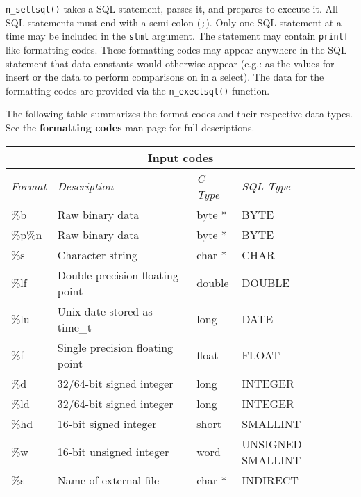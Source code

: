\DESCRIPTION

\verb`n_settsql()` takes a SQL statement, parses it, and prepares to
execute it.  All SQL statements must end with a semi-colon (\verb`;`).
Only one SQL statement at a time may be included in the \verb`stmt`
argument.  The statement may contain \verb`printf` like formatting
codes.  These formatting codes may appear anywhere in the SQL statement
that data constants would otherwise appear (e.g.:  as the values for
insert or the data to perform comparisons on in a select).  The data for
the formatting codes are provided via the \verb`n_exectsql()` function.

The following table summarizes the format codes and their respective
data types.  See the {\bf formatting codes} man page for full
descriptions.

\begin{table}{\label{tab:efmtcodes}}
\begin{tabular}{|l|l|l|l|} \hline
\multicolumn{4}{|c|}{Input codes} \\ \hline
{\em Format}  & {\em Description}               & {\em C Type}  & {\em SQL Type}    \\ \hline
\%b           & Raw binary data                 & byte *        & BYTE              \\
\%p\%n        & Raw binary data                 & byte *        & BYTE              \\
\%s           & Character string                & char *        & CHAR              \\
\%lf          & Double precision floating point & double        & DOUBLE            \\
\%lu          & Unix date stored as time\_t     & long          & DATE              \\
\%f           & Single precision floating point & float         & FLOAT             \\
\%d           & 32/64-bit signed integer        & long          & INTEGER           \\
\%ld          & 32/64-bit signed integer        & long          & INTEGER           \\
\%hd          & 16-bit signed integer           & short         & SMALLINT          \\
\%w           & 16-bit unsigned integer         & word          & UNSIGNED SMALLINT \\
\%s           & Name of external file           & char *        & INDIRECT          \\

\end{tabular}
\end{table}
